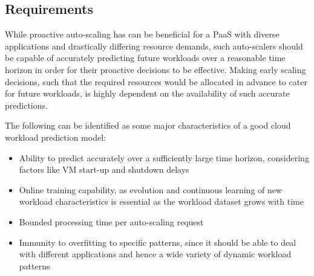\subsection{Requirements}
While proactive auto-scaling has can be beneficial for a PaaS with diverse applications and drastically differing resource demands, such auto-scalers should be capable of accurately predicting future workloads over a reasonable time horizon in order for their proactive decisions to be effective.
Making early scaling decisions, such that the required resources would be allocated in advance to cater for future workloads, is highly dependent on the availability of such accurate predictions.

The following can be identified as some major characteristics of a good cloud workload prediction model:

\begin{itemize}
\item Ability to predict accurately over a sufficiently large time horizon, considering factors like VM start-up and shutdown delays
\item Online training capability, as evolution and continuous learning of new workload characteristics is essential as the workload dataset grows with time
\item Bounded processing time per auto-scaling request
\item Immunity to overfitting to specific patterns, since it should be able to deal with different applications and hence a wide variety of dynamic workload patterns
\end{itemize}
